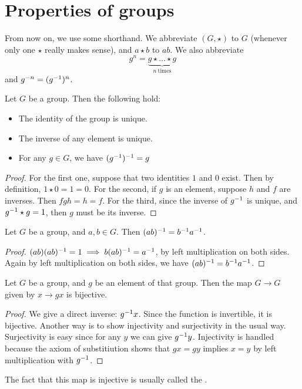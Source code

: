 \documentclass[11pt]{scrreport}
\begin{document}
\section{Properties of groups}
\begin{remark}
    From now on, we use some shorthand. We abbreviate $(G,\star)$ to $G$ (whenever only one $\star$ really makes sense), and $a\star b$ to $ab$. We also abbreviate
    \[g^n=\underbrace{g \star\dots\star g}_{n\ \text{times}}\] and $g^{-n}=(g^{-1})^n$.
\end{remark}
\begin{proposition}
    Let $G$ be a group. Then the following hold:
    \begin{itemize}
        \item The identity of the group is unique.
        \item The inverse of any element is unique.
        \item For any $g\in G$, we have $(g^{-1})^{-1}=g$
    \end{itemize}
\end{proposition}
\begin{proof}
    For the first one, suppose that two identities $1$ and $0$ exist. Then by definition, $1\star 0 = 1 = 0$. 
    For the second, if $g$ is an element, suppose $h$ and $f$ are inverses. Then $fgh = h = f$.
    For the third, since the inverse of $g^{-1}$ is unique, and $g^{-1} \star g = 1$, then $g$ must be its inverse.
\end{proof}
\begin{proposition}
    Let $G$ be a group, and $a,b\in G$. Then $(ab)^{-1} = b^{-1} a^{-1}$.
\end{proposition}
\begin{proof}
    $(ab)(ab)^{-1} = 1 \implies b(ab)^{-1} = a^{-1}$, by left multiplication on both sides. Again by left multiplication on both sides, we have $(ab)^{-1} = b^{-1} a^{-1}$.
\end{proof}
\begin{lemma}
    Let $G$ be a group, and $g$ be an element of that group. Then the map $G\to G$ given by $x\to gx$ is bijective.
\end{lemma}
\begin{proof}
    We give a direct inverse: $g^{-1} x$. Since the function is invertible, it is bijective. Another way is to show injectivity and surjectivity in the usual way. Surjectivity is easy since for any $y$ we can give $g^{-1} y$. Injectivity is handled because the axiom of substitiution shows that $gx=gy$ implies $x=y$ by left multiplication with $g^{-1}$.
\end{proof}
The fact that this map is injective is usually called the .
\end{document}

